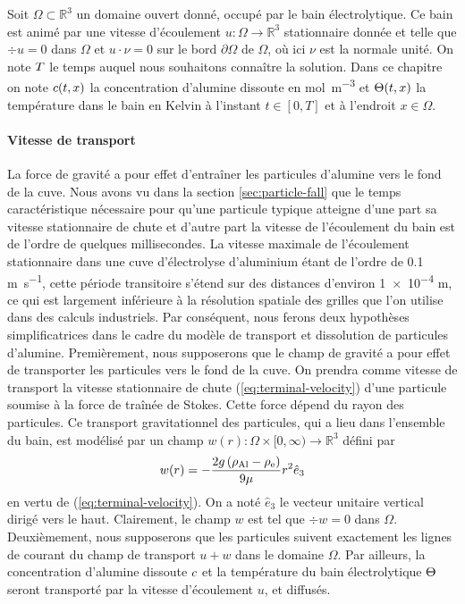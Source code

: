 Soit $\Omega\subset \mathbb R^3$ un domaine ouvert donné, occupé par
le bain électrolytique. Ce bain est animé par une vitesse d'écoulement
$u:\Omega\to\mathbb R^3$ stationnaire donnée et telle que $\div u = 0$
dans $\Omega$ et $u\cdot \nu = 0$ sur le bord $\partial \Omega$ de
$\Omega$, où ici $\nu$ est la normale unité. On note $T$ le temps
auquel nous souhaitons connaître la solution. Dans ce chapitre on note
$c(t, x)$ la concentration d'alumine dissoute en
\si{\mol\per\cubic\meter} et $\Theta(t, x)$ la température dans
le bain en Kelvin à l'instant $t \in [0, T]$ et à l'endroit $x \in
\Omega$.

\paragraph{Vitesse de transport}
La force de gravité a pour effet d'entraîner les particules d'alumine
vers le fond de la cuve. Nous avons vu dans la section
\ref{sec:particle-fall} que le temps caractéristique nécessaire pour
qu'une particule typique atteigne d'une part sa vitesse stationnaire de
chute et d'autre part la vitesse de l'écoulement du bain est de
l'ordre de quelques millisecondes. La vitesse maximale de l'écoulement
stationnaire dans une cuve d'électrolyse d'aluminium étant de l'ordre
de \num{0.1} \si{\meter\per\second}, cette période transitoire s'étend
sur des distances d'environ \num{1e-4} \si{\meter}, ce qui est
largement inférieure à la résolution spatiale des grilles que l'on
utilise dans des calculs industriels. Par conséquent, nous ferons deux
hypothèses simplificatrices dans le cadre du modèle de transport et
dissolution de particules d'alumine. Premièrement, nous supposerons
que le champ de gravité a pour effet de transporter les particules
vers le fond de la cuve. On prendra comme vitesse de transport la
vitesse stationnaire de chute (\ref{eq:terminal-velocity}) d'une
particule soumise à la force de traînée de Stokes. Cette force dépend
du rayon des particules. Ce transport gravitationnel des particules, qui
a lieu dans l'ensemble du bain, est modélisé par un champ $w(r):
\Omega\times[0, \infty)\to\mathbb R^3$ défini par
\begin{equation}\label{eq:fall-velocity}
  w(r) =
  -\frac{2g\left( \rho_\mathrm{Al} -
      \rho_\mathrm{e} \right)}{9\mu} r^2 \hat e_3
\end{equation}
en vertu de (\ref{eq:terminal-velocity}). On a noté $\hat e_3$ le
vecteur unitaire vertical dirigé vers le haut. Clairement, le champ
$w$ est tel que $\div w = 0$ dans $\Omega$. Deuxièmement, nous
supposerons que les particules suivent exactement les lignes de
courant du champ de transport $u + w$ dans le domaine $\Omega$. Par
ailleurs, la concentration d'alumine dissoute $c$ et la
température du bain électrolytique $\Theta$ seront transporté
par la vitesse d'écoulement $u$, et diffusés.

